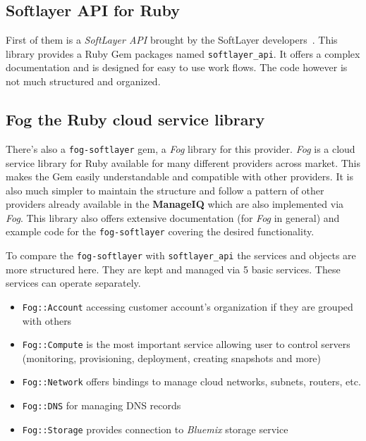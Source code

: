 \subsection{Softlayer API for Ruby}
\label{sub:Softlayer-API}

First of them is a \emph{SoftLayer API} brought by the SoftLayer developers~\cite{softlayer_api}. This library provides a Ruby Gem packages named \texttt{softlayer\_api}. It offers a complex documentation and is designed for easy to use work flows. The code however is not much structured and organized.

\subsection{Fog the Ruby cloud service library}
\label{sub:Fog cloud library}

There's also a \texttt{fog-softlayer} gem, a \emph{Fog} library for this provider. \emph{Fog} is a cloud service library for Ruby available for many different providers across market. This makes the Gem easily understandable and compatible with other providers. It is also much simpler to maintain the structure and follow a pattern of other providers already available in the \textbf{ManageIQ} which are also implemented via \emph{Fog}. This library also offers extensive documentation (for \emph{Fog} in general) and example code for the \texttt{fog-softlayer} covering the desired functionality.

To compare the \texttt{fog-softlayer} with \texttt{softlayer\_api} the services and objects are more structured here. They are kept and managed via 5 basic services. These services can operate separately.

\begin{itemize}
	\item \texttt{Fog::Account} accessing customer account's organization if they are grouped with others
	\item \texttt{Fog::Compute} is the most important service allowing user to control servers (monitoring, provisioning, deployment, creating snapshots and more)
	\item \texttt{Fog::Network} offers bindings to manage cloud networks, subnets, routers, etc.
	\item \texttt{Fog::DNS} for managing DNS records
	\item \texttt{Fog::Storage} provides connection to \emph{Bluemix} storage service
\end{itemize}

